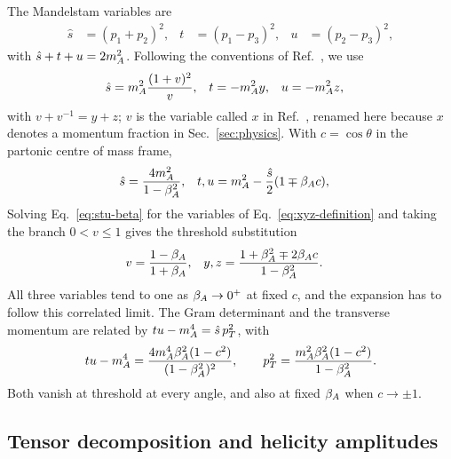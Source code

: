 The Mandelstam variables are
\begin{align}
 \hat s&=(p_1+p_2)^2,
 &t&=(p_1-p_3)^2,
 &u&=(p_2-p_3)^2,
 \label{eq:mandelstam}
\end{align}
with $\hat s+t+u=2m_A^2$. Following the conventions of Ref.~\cite{Bhattacharya:2019bmd}, we use
\begin{align}
 \hat s&=m_A^2\frac{(1+v)^2}{v},
 &t&=-m_A^2 y,
 &u&=-m_A^2 z,
 \label{eq:xyz-definition}
\end{align}
with $v+v^{-1}=y+z$; $v$ is the variable called $x$ in Ref.~\cite{Bhattacharya:2019bmd}, renamed here
because $x$ denotes a momentum fraction in Sec.~\ref{sec:physics}.
With $c=\cos\theta$ in the partonic centre of mass frame,
\begin{align}
 \hat s&=\frac{4m_A^2}{1-\beta_A^2},
 &t,u&=m_A^2-\frac{\hat s}{2}(1\mp\beta_A c),
 \label{eq:stu-beta}
\end{align}
Solving Eq.~\eqref{eq:stu-beta} for the variables of
Eq.~\eqref{eq:xyz-definition} and taking the branch $0<v\leq1$ gives the threshold substitution
\begin{align}
 v&=\frac{1-\beta_A}{1+\beta_A},
 &y,z&=\frac{1+\beta_A^2\mp2\beta_A c}{1-\beta_A^2}.
 \label{eq:threshold-map}
\end{align}
All three variables tend to one as $\beta_A\to0^+$ at fixed $c$, and the
expansion has to follow this correlated limit. The Gram determinant and the
transverse momentum are related by $tu-m_A^4=\hat s\,p_T^2$, with
\begin{equation}
 tu-m_A^4
 =\frac{4m_A^4\beta_A^2(1-c^2)}{(1-\beta_A^2)^2},
 \qquad
 p_T^2=\frac{m_A^2\beta_A^2(1-c^2)}{1-\beta_A^2}.
 \label{eq:gram-scaling}
\end{equation}
Both vanish at threshold at every angle, and also at fixed $\beta_A$ when $c\to\pm1$.



\subsection{Tensor decomposition and helicity amplitudes}

